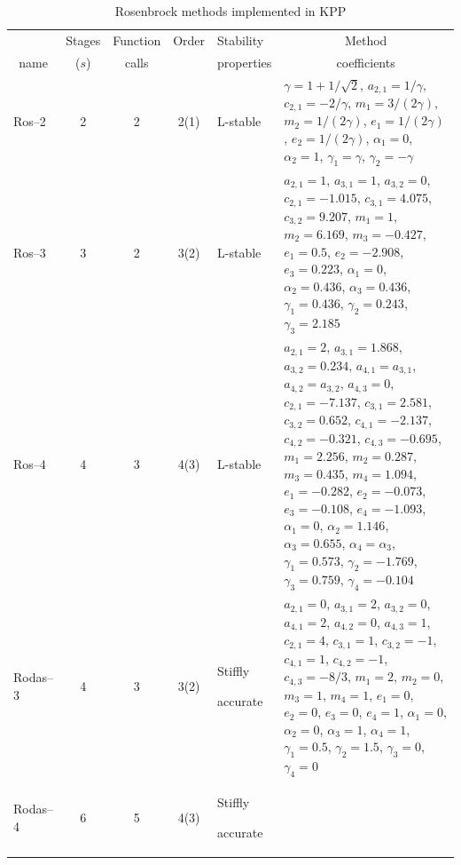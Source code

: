 \documentclass[twoside]{article}
\newcommand{\hhline}{\noalign{\vspace{1mm}}\hline\noalign{\vspace{1mm}}}
\begin{document}
\begin{table}
\begin{center}
\caption{Rosenbrock methods implemented in KPP}
\label{tab:Rosenbrock}
\begin{tabular}{lcccp{1.5cm}p{9.5cm}}
\hhline
\multicolumn{1}{c}{Method} & Stages & Function & Order & Stability  & 
\multicolumn{1}{c}{Method}\\
\multicolumn{1}{c}{name}   & ($s$)  & calls    &       & properties & 
\multicolumn{1}{c}{coefficients}\\
\hhline
Ros--2 & 2 & 2 & 2(1) & L-stable &
  $\gamma = 1 + 1/\sqrt{2}$,
  $a_{2,1} = 1/\gamma$,
  $c_{2,1} = -2/\gamma$,
  $m_1 = 3/(2\gamma)$,
  $m_2 = 1/(2\gamma)$,
  $e_1 = 1/(2\gamma)$,
  $e_2 = 1/(2\gamma)$,
  $\alpha_1 = 0$,
  $\alpha_2 = 1$,
  $\gamma_1 = \gamma$,
  $\gamma_2 = -\gamma$\\
Ros--3 & 3 & 2 & 3(2) & L-stable & 
  $a_{2,1} = 1$,
  $a_{3,1} = 1$,
  $a_{3,2} = 0$,
  $c_{2,1} = -1.015$,
  $c_{3,1} = 4.075$,
  $c_{3,2} = 9.207$,
  $m_1 = 1$,
  $m_2 = 6.169$,
  $m_3 = -0.427$,
  $e_1 = 0.5$,
  $e_2 = -2.908$,
  $e_3 = 0.223$,
  $\alpha_1 = 0$,
  $\alpha_2 = 0.436$,
  $\alpha_3 = 0.436$,
  $\gamma_1 = 0.436$,
  $\gamma_2 = 0.243$,
  $\gamma_3 = 2.185$\\
Ros--4 & 4 & 3 & 4(3) & L-stable & 
  $a_{2,1} = 2$,
  $a_{3,1} = 1.868$,
  $a_{3,2} = 0.234$,
  $a_{4,1} = a_{3,1}$,
  $a_{4,2} = a_{3,2}$,
  $a_{4,3} = 0$,
  $c_{2,1} = -7.137$,
  $c_{3,1} = 2.581$,
  $c_{3,2} = 0.652$,
  $c_{4,1} = -2.137$,
  $c_{4,2} = -0.321$,
  $c_{4,3} = -0.695$,
  $m_1 = 2.256$,
  $m_2 = 0.287$,
  $m_3 = 0.435$,
  $m_4 = 1.094$,
  $e_1 = -0.282$,
  $e_2 = -0.073$,
  $e_3 = -0.108$,
  $e_4 = -1.093$,
  $\alpha_1 = 0$,
  $\alpha_2 = 1.146$,
  $\alpha_3 = 0.655$,
  $\alpha_4 = \alpha_3$,
  $\gamma_1 = 0.573$,
  $\gamma_2 = -1.769$,
  $\gamma_3 = 0.759$,
  $\gamma_4 = -0.104$\\
Rodas--3 & 4 & 3 & 3(2) & Stiffly\par accurate & 
  $a_{2,1} = 0$,
  $a_{3,1} = 2$,
  $a_{3,2} = 0$,
  $a_{4,1} = 2$,
  $a_{4,2} = 0$,
  $a_{4,3} = 1$,
  $c_{2,1} = 4$,
  $c_{3,1} = 1$,
  $c_{3,2} = -1$,
  $c_{4,1} = 1$,
  $c_{4,2} = -1$,
  $c_{4,3} = -8/3$,
  $m_1 = 2$,
  $m_2 = 0$,
  $m_3 = 1$,
  $m_4 = 1$,
  $e_1 = 0$,
  $e_2 = 0$,
  $e_3 = 0$,
  $e_4 = 1$,
  $\alpha_1 = 0$,
  $\alpha_2 = 0$,
  $\alpha_3 = 1$,
  $\alpha_4 = 1$,
  $\gamma_1 = 0.5$,
  $\gamma_2 = 1.5$,
  $\gamma_3 = 0$,
  $\gamma_4 = 0$\\
Rodas--4 & 6 & 5 & 4(3) & Stiffly\par accurate &

\end{tabular}
\end{center}
\end{table}
\end{document}
